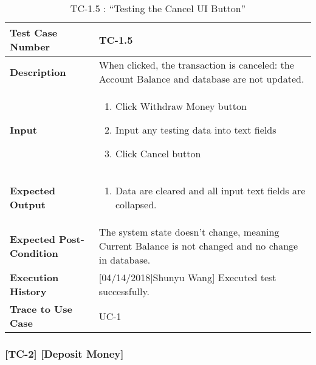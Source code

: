 \documentclass[12pt]{article}
\begin{document}
\begin{table}[H]
\caption{TC-1.5 : “Testing the Cancel UI Button”}
\begin{center}
\begin{tabular}{|p{5 cm}|p{12cm}|}
\hline
\bf Test Case Number & 
TC-1.5 \\
\hline
\bf Description & 
When clicked, the transaction is canceled: the Account Balance and database are not updated.\\
\hline
\bf Input & 
\begin{enumerate}
  \item Click Withdraw Money button
  \item Input any testing data into text fields
  \item Click Cancel button
\end{enumerate} \\
\hline
\bf Expected Output & 
\begin{enumerate}
  \item Data are cleared and all input text fields are collapsed.
\end{enumerate} \\
\hline
\bf Expected Post-Condition & 
The system state doesn’t change, meaning Current Balance is not changed and no change in database.\\
\hline
\bf Execution History & 
[04/14/2018|Shunyu Wang] Executed test successfully.\\
\hline
\bf Trace to Use Case & 
UC-1\\
\hline

\end{tabular}
\end{center}
\end{table}

\subsubsection{[TC-2] [Deposit Money]} \label{tc:2}
\end{document}
